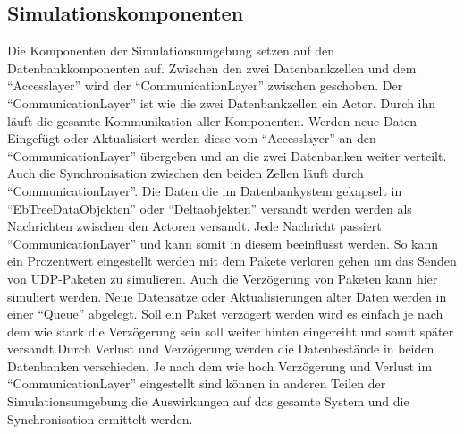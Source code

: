 \documentclass[a4paper,11pt,oneside,%
headsepline,												%
footsepline,												%
bibtotocnumbered									%
]{scrreprt}
\begin{document}
\subsection{Simulationskomponenten}	
Die Komponenten der Simulationsumgebung setzen auf den Datenbankkomponenten auf. Zwischen den zwei Datenbankzellen und dem \enquote{Accesslayer} wird der \enquote{CommunicationLayer} zwischen geschoben. Der \enquote{CommunicationLayer} ist wie die zwei Datenbankzellen ein Actor. Durch ihn läuft die gesamte Kommunikation aller Komponenten. Werden neue Daten Eingefügt oder Aktualisiert werden diese vom \enquote{Accesslayer} an den \enquote{CommunicationLayer} übergeben und an die zwei Datenbanken weiter verteilt. Auch die Synchronisation zwischen den beiden Zellen läuft durch \enquote{CommunicationLayer}. Die Daten die im Datenbankystem gekapselt in \enquote{EbTreeDataObjekten} oder \enquote{Deltaobjekten} versandt werden werden als Nachrichten zwischen den Actoren versandt. Jede Nachricht passiert \enquote{CommunicationLayer} und kann somit in diesem beeinflusst werden. So kann ein Prozentwert eingestellt werden mit dem Pakete verloren gehen um das Senden von UDP-Paketen zu simulieren. Auch die Verzögerung von Paketen kann hier simuliert werden. Neue Datensätze oder Aktualisierungen alter Daten werden in einer \enquote{Queue} abgelegt. Soll ein Paket verzögert werden wird es einfach je nach dem wie stark die Verzögerung sein soll weiter hinten eingereiht und somit später versandt.Durch Verlust und Verzögerung werden die Datenbestände in beiden Datenbanken verschieden. Je nach dem wie hoch Verzögerung und Verlust im \enquote{CommunicationLayer} eingestellt sind können in anderen Teilen der Simulationsumgebung die Auswirkungen auf das gesamte System und die Synchronisation ermittelt werden.\\\\
\end{document}
